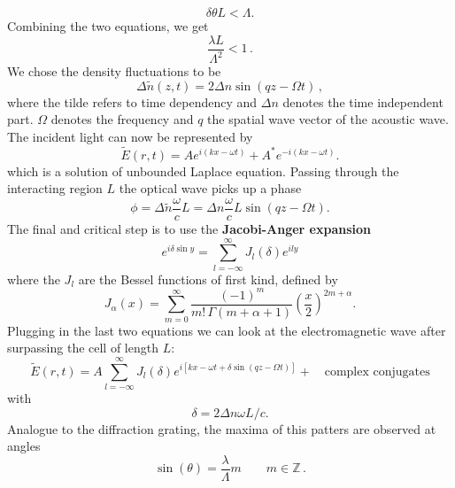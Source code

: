 \begin{equation}
    \delta \theta L < \Lambda.
\end{equation}
Combining the two equations, we get
\begin{equation}
    \frac{\lambda L}{\Lambda^2} < 1 \, .
\end{equation}
We chose the density fluctuations to be 
\begin{equation}
    \Delta \tilde{n}(z,t) = 2 \Delta n \sin(q z - \Omega t) \, ,
\end{equation}
where the tilde refers to time dependency and $\Delta n$ denotes the time independent part.
$\Omega$ denotes the frequency and $q$ the spatial wave vector of the acoustic wave.
The incident light can now be represented by 
\begin{equation}
    \tilde{E}(r,t) = A e ^{i(kx - \omega t)} + A^{*}e ^{-i(kx - \omega t)}.
\end{equation}
which is a solution of unbounded Laplace equation. 
Passing through the interacting region $L$ the optical wave picks up a phase 
\begin{equation}
    \phi = \Delta \tilde{n}\frac{\omega}{c}L = \Delta n \frac{\omega}{c}L \sin (qz - \Omega t).
\end{equation}
The final and critical step is to use the \textbf{Jacobi-Anger expansion}
\begin{equation}
    e^{i\delta \sin y} = \sum_{l = -\infty}^{\infty} J_l(\delta)e^{ily} 
\end{equation}
where the $J_l$ are the Bessel functions of first kind, defined by
\begin{equation}
J_\alpha(x) = \sum_{m=0}^\infty \frac{(-1)^m}{m! \, \Gamma(m+\alpha+1)} {\left(\frac{x}{2}\right)}^{2m+\alpha}.
\end{equation}
Plugging in the last two equations we can look at the electromagnetic wave after surpassing the 
cell of length $L$:
\begin{equation}
    \tilde{E}(r,t)=A \sum_{l = -\infty}^{\infty} J_l(\delta)e^{i
        \left [kx -\omega t + \delta \sin(qz - \Omega t) \right ]  } + \quad \text{complex conjugates}
\end{equation}
with
\begin{equation}
    \delta = 2\Delta n \omega L / c.
\end{equation}
Analogue to the diffraction grating, the maxima of this patters 
are observed at angles
\begin{equation}
    \sin(\theta) = \frac{\lambda}{\Lambda} m \qquad m \in \mathbb{Z} \, .
\end{equation}
